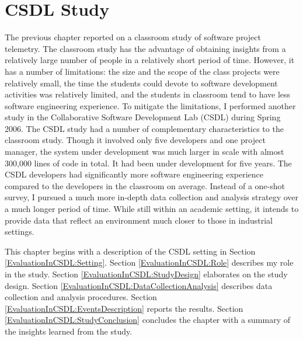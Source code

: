 \chapter{CSDL Study} \label{Chapter:EvaluationInCSDL}


The previous chapter reported on a classroom study of software project telemetry. The classroom study has the advantage of obtaining insights from a relatively large number of people in a relatively short period of time.  However, it has a number of limitations: the size and the scope of the class projects were relatively small, the time the students could devote to software development activities was relatively limited, and the students in classroom tend to have less software engineering experience.
To mitigate the limitations, I performed another study in the Collaborative Software Development Lab (CSDL) during Spring 2006. The CSDL study had a number of complementary characteristics to the classroom study. Though it involved only five developers and one project manager, the system under development was much larger in scale with almost 300,000 lines of code in total. It had been under development for five years. The CSDL developers had significantly more software engineering experience compared to the developers in the classroom on average. 
Instead of a one-shot survey, I pursued a much more in-depth data collection and analysis strategy over a much longer period of time. 
While still within an academic setting, it intends to provide data that reflect an environment much closer to those in industrial settings.



This chapter begins with a description of the CSDL setting in Section \ref{EvaluationInCSDL:Setting}.
Section \ref{EvaluationInCSDL:Role} describes my role in the study.
Section \ref{EvaluationInCSDL:StudyDesign} elaborates on the study design.
Section \ref{EvaluationInCSDL:DataCollectionAnalysis} describes data collection and analysis procedures.
Section \ref{EvaluationInCSDL:EventsDescription} reports the results. 
Section \ref{EvaluationInCSDL:StudyConclusion} concludes the chapter with a summary of the insights learned from the study.


